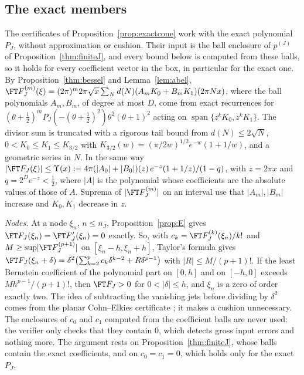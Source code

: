 \subsection{The exact members}\label{app:exact}

The certificates of Proposition~\ref{prop:exactcone} work with the exact polynomial $P_J$, without approximation or cushion. Their input
is the ball enclosure of $p^{(J)}$ of Proposition~\ref{thm:finiteJ}, and every bound below is computed from these balls, so it holds for
every coefficient vector in the box, in particular for the exact one. By Proposition~\ref{thm:bessel} and Lemma~\ref{lem:abel},
$\FT F_J^{(m)}(\xi)=(2\pi)^m2\pi\sqrt x\sum_Nd(N)(A_mK_0+B_mK_1)(2\pi Nx)$, where the ball polynomials $A_m,B_m$, of degree at most $D$, come
from exact recurrences for $(\theta+\frac12)^mP_J(-(\theta+\frac12)^2)\theta^2(\theta+1)^2$ acting on $\operatorname{span}\{z^kK_0,z^kK_1\}$.
The divisor sum is truncated with a rigorous tail bound from $d(N)\le2\sqrt N$, $0<K_0\le K_1\le K_{3/2}$ with
$K_{3/2}(w)=(\pi/2w)^{1/2}e^{-w}(1+1/w)$, and a geometric series in $N$. In the same way
$\lvert\FT F_J(\xi)\rvert\le\Upsilon(x):=4\pi(\lvert A_0\rvert+\lvert B_0\rvert)(z)\,e^{-z}(1+1/z)/(1-q)$, with $z=2\pi x$ and
$q=2^De^{-z}<\frac12$, where $\lvert A\rvert$ is the polynomial whose coefficients are the absolute values of those of $A$. Suprema of
$\lvert\FT F_J^{(m)}\rvert$ on an interval use that $\lvert A_m\rvert,\lvert B_m\rvert$ increase and $K_0,K_1$ decrease in $z$.

\emph{Nodes.} At a node $\xi_n$, $n\le n_J$, Proposition~\ref{prop:E} gives $\FT F_J(\xi_n)=\FT F_J'(\xi_n)=0$ exactly. So, with
$c_k=\FT F_J^{(k)}(\xi_n)/k!$ and $M\ge\sup\lvert\FT F_J^{(p+1)}\rvert$ on $[\xi_n-h,\xi_n+h]$, Taylor's formula gives
$\FT F_J(\xi_n+\delta)=\delta^2\bigl(\sum_{k=2}^pc_k\delta^{k-2}+R\delta^{p-1}\bigr)$ with $\lvert R\rvert\le M/(p+1)!$. If the least Bernstein
coefficient of the polynomial part on $[0,h]$ and on $[-h,0]$ exceeds $Mh^{p-1}/(p+1)!$, then $\FT F_J>0$ for $0<\lvert\delta\rvert\le h$,
and $\xi_n$ is a zero of order exactly two. The idea of subtracting the vanishing jets before dividing by $\delta^2$ comes from the
planar Cohn--Elkies certificate \cite{OAI26planar}; it makes a cushion unnecessary. The enclosures of $c_0$ and $c_1$ computed from the
coefficient balls are never used: the verifier only checks that they contain $0$, which detects gross input errors and nothing more. The
argument rests on Proposition~\ref{thm:finiteJ}, whose balls contain the exact coefficients, and on $c_0=c_1=0$, which holds only for the
exact $P_J$.

